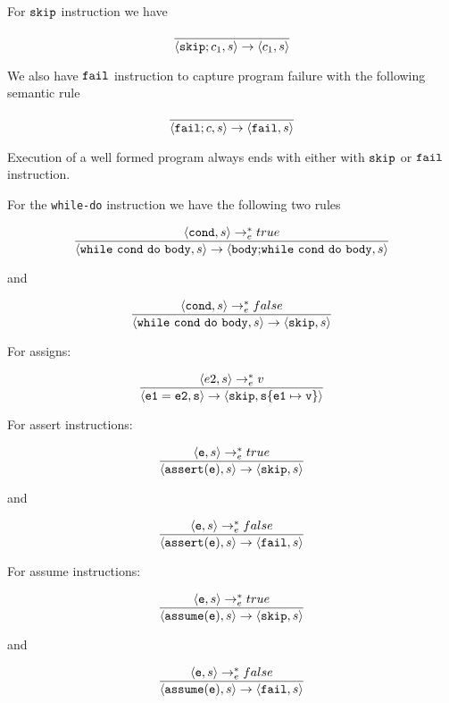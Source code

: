 For \(\skp\) instruction we have

\[\rl{}{\ex{\skp;c_1}{s}{c_1}{s}}\]



We also have \(\fl\) instruction to capture program failure with the following semantic rule

\[\rl{}{\ex{\fl;c}{s}{\fl}{s}}\]

Execution of a well formed program always ends with either with \(\skp\) or \(\fl\)
instruction.



For the {\tt while-do} instruction we have the following two rules

\[\rl{\exastar{{\tt cond}}{s}{true}} {\ex{\whld{cond}{body}} {s} {{\tt body;}\whld{cond}{body}}{s}}\]

and

\[\rl{\exastar{{\tt cond}}{s}{false}} {\ex{\whld{cond}{body}} {s} {\skp} {s}}\]


For assigns:

\[\rl{\exastar{e2}{s}{ v}}{\ex{\tt e1 = e2} {s} {\skp} {\chng{s} {e1} {v}}}\]


For assert instructions:

\[\rl{\exastar{{\tt e}}{s}{true} }{\ex{{\tt assert(e)}} {s} {\skp} {s}}\]

and

\[\rl{\exastar{{\tt e}}{s}{false}}{\ex{{\tt assert(e)}} {s} {\fl} {s}}\]

For assume instructions:

\[\rl{\exastar{{\tt e}}{s}{true}}{\ex{{\tt assume(e)}} {s} {\skp} {s}}\]

and

\[\rl{\exastar{{\tt e}}{s}{false}}{\ex{{\tt assume(e)}} {s} {\fl} {s}}\]
  
